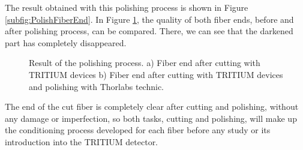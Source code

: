 The result obtained with this polishing process is shown in Figure \ref{subfig:PolishFiberEnd}. In Figure \ref{fig:ResultofPolishingProcess}, the quality of both fiber ends, before and after polishing process, can be compared. There, we can see that the darkened part has completely disappeared. 

\begin{figure}[htbp]
 \centering
 \caption{Result of the polishing process. a) Fiber end after cutting with TRITIUM devices b) Fiber end after cutting with TRITIUM devices and polishing with Thorlabs technic.}
 \label{fig:ResultofPolishingProcess}
\end{figure}

The end of the cut fiber is completely clear after cutting and polishing, without any damage or imperfection, so both tasks, cutting and polishing, will make up the conditioning process developed for each fiber before any study or its introduction into the TRITIUM detector.